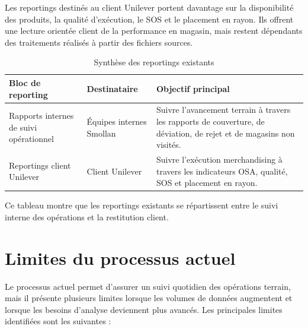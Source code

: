 Les reportings destinés au client Unilever portent davantage sur la disponibilité des produits, la qualité d’exécution, le SOS et le placement en rayon. Ils offrent une lecture orientée client de la performance en magasin, mais restent dépendants des traitements réalisés à partir des fichiers sources.

\begin{table}[H]
\centering
\caption{Synthèse des reportings existants}
\label{tab:reportings-existants}
\renewcommand{\arraystretch}{1.25}
\small
\begin{tabularx}{0.95\textwidth}{
|>{\raggedright\arraybackslash}p{3.6cm}
|>{\raggedright\arraybackslash}p{3.4cm}
|>{\raggedright\arraybackslash}X|
}
\hline
\textbf{Bloc de reporting} & \textbf{Destinataire} & \textbf{Objectif principal} \\
\hline
Rapports internes de suivi opérationnel
& Équipes internes Smollan
& Suivre l’avancement terrain à travers les rapports de couverture, de déviation, de rejet et de magasins non visités. \\
\hline
Reportings client Unilever
& Client Unilever
& Suivre l’exécution merchandising à travers les indicateurs OSA, qualité, SOS et placement en rayon. \\
\hline
\end{tabularx}
\end{table}

Ce tableau montre que les reportings existants se répartissent entre le suivi interne des opérations et la restitution client.

\section{Limites du processus actuel}

Le processus actuel permet d’assurer un suivi quotidien des opérations terrain, mais il présente plusieurs limites lorsque les volumes de données augmentent et lorsque les besoins d’analyse deviennent plus avancés. Les principales limites identifiées sont les suivantes :


